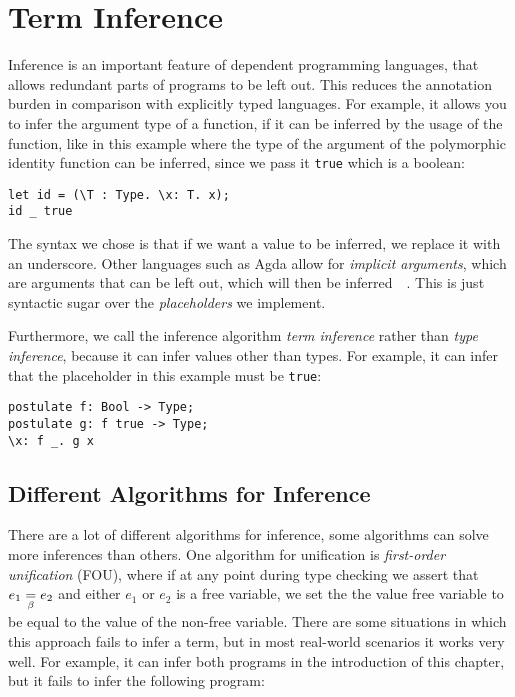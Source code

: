 \chapter{Term Inference}
\label{ch:inference}

Inference is an important feature of dependent programming languages, that allows redundant parts of programs to be left out. This reduces the annotation burden in comparison with explicitly typed languages. For example, it allows you to infer the argument type of a function, if it can be inferred by the usage of the function, like in this example where the type of the argument of the polymorphic identity function can be inferred, since we pass it \verb|true| which is a boolean:
\begin{lstlisting}
let id = (\T : Type. \x: T. x);
id _ true
\end{lstlisting}

The syntax we chose is that if we want a value to be inferred, we replace it with an underscore. Other languages such as Agda allow for \emph{implicit arguments}, which are arguments that can be left out, which will then be inferred~\cite{agda}~\cite{coq}. This is just syntactic sugar over the \emph{placeholders} we implement.

Furthermore, we call the inference algorithm \emph{term inference} rather than \emph{type inference}, because it can infer values other than types. For example, it can infer that the placeholder in this example must be \verb|true|:
\begin{lstlisting}
postulate f: Bool -> Type;
postulate g: f true -> Type;
\x: f _. g x
\end{lstlisting}

\section{Different Algorithms for Inference}
\label{strength-inference}

There are a lot of different algorithms for inference\cite{typeinference}, some algorithms can solve more inferences than others. One algorithm for unification is \emph{first-order unification} (FOU), where if at any point during type checking we assert that $e_1 \underset{\beta}{=} e_2$ and either $e_1$ or $e_2$ is a free variable, we set the the value free variable to be equal to the value of the non-free variable. There are some situations in which this approach fails to infer a term, but in most real-world scenarios it works very well. For example, it can infer both programs in the introduction of this chapter, but it fails to infer the following program:

